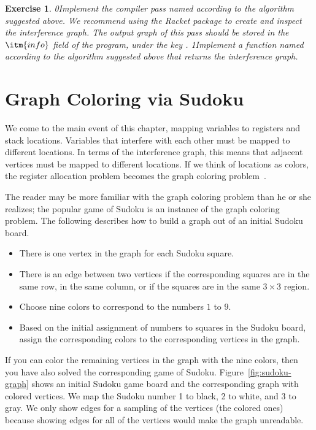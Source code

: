 \documentclass[7x10,nocrop]{TimesAPriori_MIT}%
\def\racketEd{0}
\def\pythonEd{1}
\def\edition{0}
\newcommand{\racket}[1]{{\if\edition\racketEd{#1}\fi}}
\newcommand{\python}[1]{{\if\edition\pythonEd #1\fi}}
\newtheorem{exercise}[theorem]{Exercise}
\begin{document}
\begin{exercise}\normalfont\normalsize
\racket{Implement the compiler pass named \code{build\_interference} according
to the algorithm suggested above. We recommend using the Racket
  \code{graph} package to create and inspect the interference graph.
The output graph of this pass should be stored in the $\itm{info}$ field of
the program, under the key \code{conflicts}.}
%
\python{Implement a function named 
  according to the algorithm suggested above that
  returns the interference graph.}
\end{exercise}

  
\section{Graph Coloring via Sudoku}
\label{sec:graph-coloring}

We come to the main event of this chapter, mapping variables to
registers and stack locations. Variables that interfere with each
other must be mapped to different locations.  In terms of the
interference graph, this means that adjacent vertices must be mapped
to different locations.  If we think of locations as colors, the
register allocation problem becomes the graph coloring
problem~\citep{Balakrishnan:1996ve,Rosen:2002bh}.

The reader may be more familiar with the graph coloring problem than he
or she realizes; the popular game of Sudoku is an instance of the
graph coloring problem. The following describes how to build a graph
out of an initial Sudoku board.
\begin{itemize}
\item There is one vertex in the graph for each Sudoku square.
\item There is an edge between two vertices if the corresponding squares
  are in the same row, in the same column, or if the squares are in
  the same $3\times 3$ region.
\item Choose nine colors to correspond to the numbers $1$ to $9$.
\item Based on the initial assignment of numbers to squares in the
  Sudoku board, assign the corresponding colors to the corresponding
  vertices in the graph.
\end{itemize}
If you can color the remaining vertices in the graph with the nine
colors, then you have also solved the corresponding game of Sudoku.
Figure~\ref{fig:sudoku-graph} shows an initial Sudoku game board and
the corresponding graph with colored vertices.  We map the Sudoku
number 1 to black, 2 to white, and 3 to gray.  We only show edges for a
sampling of the vertices (the colored ones) because showing edges for
all of the vertices would make the graph unreadable.
\end{document}
